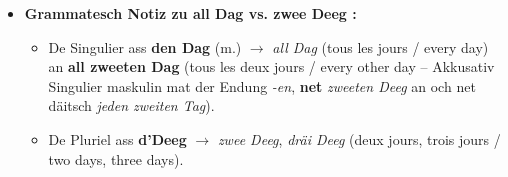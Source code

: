 \begin{itemize}
    \item \textbf{Grammatesch Notiz zu \flqq all Dag\frqq{} vs. \flqq zwee Deeg\frqq{} :}
    \begin{itemize}
        \item De Singulier ass \textbf{den Dag} (m.) $\rightarrow$ \textit{all Dag} (tous les jours / every day) an \textbf{all zweeten Dag} (tous les deux jours / every other day -- Akkusativ Singulier maskulin mat der Endung \textit{-en}, \textbf{net} \textit{\flqq *zweeten Deeg\frqq} an och net däitsch \textit{\flqq *jeden zweiten Tag\frqq}).
        \item De Pluriel ass \textbf{d'Deeg} $\rightarrow$ \textit{zwee Deeg}, \textit{dräi Deeg} (deux jours, trois jours / two days, three days).
    \end{itemize}

    \vspace{0.4em}


\end{itemize}

